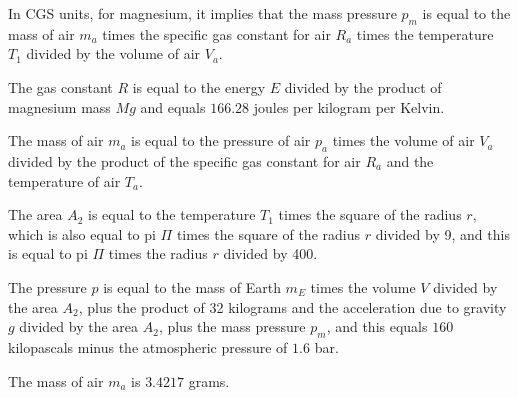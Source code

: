 In CGS units, for magnesium, it implies that the mass pressure \( p_m \) is equal to the mass of air \( m_a \) times the specific gas constant for air \( R_a \) times the temperature \( T_1 \) divided by the volume of air \( V_a \).

The gas constant \( R \) is equal to the energy \( E \) divided by the product of magnesium mass \( Mg \) and equals \( 166.28 \) joules per kilogram per Kelvin.

The mass of air \( m_a \) is equal to the pressure of air \( p_a \) times the volume of air \( V_a \) divided by the product of the specific gas constant for air \( R_a \) and the temperature of air \( T_a \).

The area \( A_2 \) is equal to the temperature \( T_1 \) times the square of the radius \( r \), which is also equal to pi \( \Pi \) times the square of the radius \( r \) divided by 9, and this is equal to pi \( \Pi \) times the radius \( r \) divided by 400.

The pressure \( p \) is equal to the mass of Earth \( m_E \) times the volume \( V \) divided by the area \( A_2 \), plus the product of 32 kilograms and the acceleration due to gravity \( g \) divided by the area \( A_2 \), plus the mass pressure \( p_m \), and this equals \( 160 \) kilopascals minus the atmospheric pressure of \( 1.6 \) bar.

The mass of air \( m_a \) is \( 3.4217 \) grams.